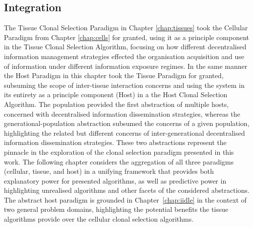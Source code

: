 \subsection{Integration}
The Tissue Clonal Selection Paradigm in Chapter \ref{chap:tissues} took the Cellular Paradigm from Chapter \ref{chap:cells} for granted, using it as a principle component in the Tissue Clonal Selection Algorithm, focusing on how different decentralised information management strategies effected the organisation acquisition and use of information under different information exposure regimes. In the same manner the Host Paradigm in this chapter took the Tissue Paradigm for granted, subsuming the scope of inter-tissue interaction concerns and using the system in its entirety as a principle component (Host) in a the Host Clonal Selection Algorithm. The population provided the first abstraction of multiple hosts, concerned with decentralised information dissemination strategies, whereas the generational-population abstraction subsumed the concerns of a given population, highlighting the related but different concerns of inter-generational decentralised information dissemination strategies. These two abstractions represent the pinnacle in the exploration of the clonal selection paradigm presented in this work. The following chapter considers the aggregation of all three paradigms (cellular, tissue, and host) in a unifying framework that provides both explanatory power for presented algorithms, as well as predictive power in highlighting unrealised algorithms and other facets of the considered abstractions.
The abstract host paradigm is grounded in Chapter~\ref{chap:iidle} in the context of two general problem domains, highlighting the potential benefits the tissue algorithms provide over the cellular clonal selection algorithms.


